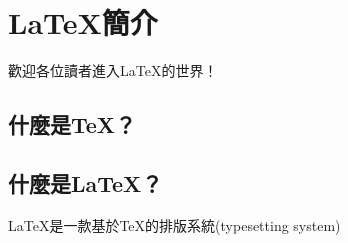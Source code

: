 \documentclass[12pt, a4paper, oneside]{extbook}
\let\tmpTeX\TeX
\renewcommand{\TeX}{\textrm{\tmpTeX}}
\let\tmpLaTeX\LaTeX
\renewcommand{\LaTeX}{\textrm{\tmpLaTeX}}
\begin{document}
			
		
		
	\chapter{\LaTeX 簡介}
		歡迎各位讀者進入\LaTeX 的世界！
		
		

	\section{什麼是\TeX ？}
	\section{什麼是\LaTeX ？}
		\LaTeX 是一款基於\TeX 的排版系統(typesetting system)
\end{document}
